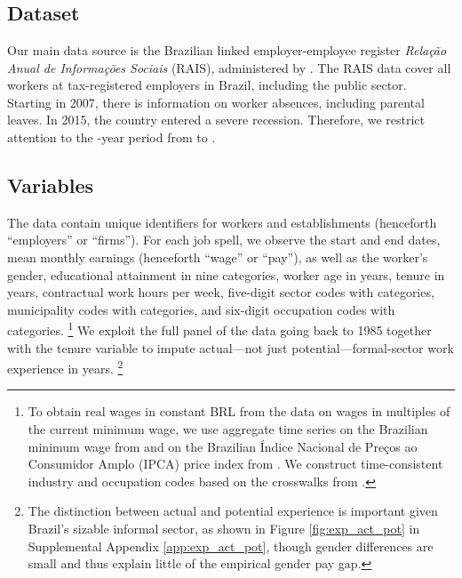 

\section{{\sectiontwo}\label{sec:Data}}

\subsection{Dataset}

Our main data source is the Brazilian linked employer-employee register \emph{Rela{\c{c}}{\~{a}o} Anual de Informa{\c{c}}{\~{o}}es Sociais} (RAIS), administered by \citet{MinisteriodaEconomia2022}. The RAIS data cover all workers at tax-registered employers in Brazil, including the public sector. Starting in 2007, there is information on worker absences, including parental leaves. In 2015, the country entered a severe recession. Therefore, we restrict attention to the {\Nyears}-year period from \yearmin{} to \yearmax{}.


\subsection{Variables}

The data contain unique identifiers for workers and establishments (henceforth ``employers'' or ``firms''). For each job spell, we observe the start and end dates, mean monthly earnings (henceforth ``wage'' or ``pay''), as well as the worker's gender, educational attainment in nine categories, worker age in years, tenure in years, contractual work hours per week, five-digit sector codes with  categories, municipality codes with  categories, and six-digit occupation codes with  categories.%
%
\footnote{To obtain real wages in constant BRL from the data on wages in multiples of the current minimum wage, we use aggregate time series on the Brazilian minimum wage from \citet{IPEA2020} and on the Brazilian {\'{I}}ndice Nacional de Pre{\c{c}}os ao Consumidor Amplo (IPCA) price index from \citet{IPEA2019}. We construct time-consistent industry and occupation codes based on the crosswalks from \citet{EngbomMoser2022b}.} %
%
We exploit the full panel of the data going back to 1985 together with the tenure variable to impute actual---not just potential---formal-sector work experience in years.%
%
\footnote{The distinction between actual and potential experience is important given Brazil's sizable informal sector, as shown in Figure \ref{fig:exp_act_pot} in Supplemental Appendix \ref{app:exp_act_pot}, though gender differences are small and thus explain little of the empirical gender pay gap.} %
%


